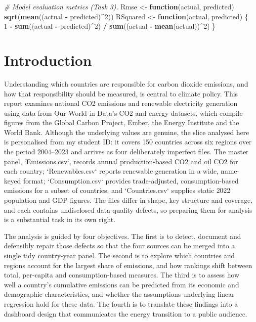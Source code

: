 \documentclass[
]{article}
\newenvironment{Shaded}{\begin{snugshade}}{\end{snugshade}}
\newcommand{\CommentTok}[1]{\textcolor[rgb]{0.56,0.35,0.01}{\textit{#1}}}
\newcommand{\ControlFlowTok}[1]{\textcolor[rgb]{0.13,0.29,0.53}{\textbf{#1}}}
\newcommand{\DecValTok}[1]{\textcolor[rgb]{0.00,0.00,0.81}{#1}}
\newcommand{\FunctionTok}[1]{\textcolor[rgb]{0.13,0.29,0.53}{\textbf{#1}}}
\newcommand{\NormalTok}[1]{#1}
\newcommand{\OtherTok}[1]{\textcolor[rgb]{0.56,0.35,0.01}{#1}}
\newcommand{\SpecialCharTok}[1]{\textcolor[rgb]{0.81,0.36,0.00}{\textbf{#1}}}
\begin{document}
\begin{Shaded}
\begin{Highlighting}[]
\CommentTok{\# Model evaluation metrics (Task 3).}
\NormalTok{Rmse }\OtherTok{\textless{}{-}} \ControlFlowTok{function}\NormalTok{(actual, predicted) }\FunctionTok{sqrt}\NormalTok{(}\FunctionTok{mean}\NormalTok{((actual }\SpecialCharTok{{-}}\NormalTok{ predicted)}\SpecialCharTok{\^{}}\DecValTok{2}\NormalTok{))}
\NormalTok{RSquared }\OtherTok{\textless{}{-}} \ControlFlowTok{function}\NormalTok{(actual, predicted) \{}
  \DecValTok{1} \SpecialCharTok{{-}} \FunctionTok{sum}\NormalTok{((actual }\SpecialCharTok{{-}}\NormalTok{ predicted)}\SpecialCharTok{\^{}}\DecValTok{2}\NormalTok{) }\SpecialCharTok{/} \FunctionTok{sum}\NormalTok{((actual }\SpecialCharTok{{-}} \FunctionTok{mean}\NormalTok{(actual))}\SpecialCharTok{\^{}}\DecValTok{2}\NormalTok{)}
\NormalTok{\}}
\end{Highlighting}
\end{Shaded}

\newpage

\section{Introduction}\label{introduction}

Understanding which countries are responsible for carbon dioxide
emissions, and how that responsibility should be measured, is central to
climate policy. This report examines national CO2 emissions and
renewable electricity generation using data from Our World in Data's CO2
and energy datasets, which compile figures from the Global Carbon
Project, Ember, the Energy Institute and the World Bank. Although the
underlying values are genuine, the slice analysed here is personalised
from my student ID: it covers 150 countries across six regions over the
period 2004--2023 and arrives as four deliberately imperfect files. The
master panel, `Emissions.csv`, records annual production-based CO2 and
oil CO2 for each country; `Renewables.csv` reports renewable generation
in a wide, name-keyed format; `Consumption.csv` provides trade-adjusted,
consumption-based emissions for a subset of countries; and
`Countries.csv` supplies static 2022 population and GDP figures. The
files differ in shape, key structure and coverage, and each contains
undisclosed data-quality defects, so preparing them for analysis is a
substantial task in its own right.

The analysis is guided by four objectives. The first is to detect,
document and defensibly repair those defects so that the four sources
can be merged into a single tidy country-year panel. The second is to
explore which countries and regions account for the largest share of
emissions, and how rankings shift between total, per-capita and
consumption-based measures. The third is to assess how well a country's
cumulative emissions can be predicted from its economic and demographic
characteristics, and whether the assumptions underlying linear
regression hold for these data. The fourth is to translate these
findings into a dashboard design that communicates the energy transition
to a public audience.
\end{document}
